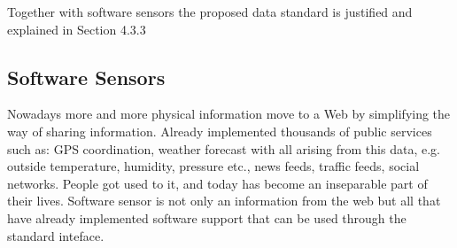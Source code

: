     Together with software sensors the proposed data standard is justified and explained in Section 4.3.3

	\subsection {Software Sensors}
	Nowadays more and more physical information move to a Web by simplifying the way of sharing information. Already implemented thousands of public services such as: GPS coordination, weather forecast with all arising from this data, e.g. outside temperature, humidity, pressure etc., news feeds, traffic feeds, social networks. People got used to it, and today has become an inseparable part of their lives. Software sensor is not only an information from the web but all that have already implemented software support that can be used through the standard inteface.
	
